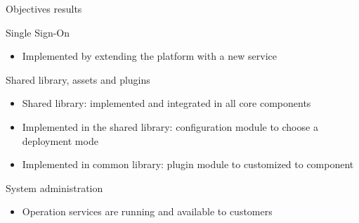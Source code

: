 \documentclass[10pt]{beamer}
\begin{document}
\begin{frame}{Objectives results}
  \begin{block}{Single Sign-On}
  \begin{itemize}
    \item Implemented by extending the platform with a new service
  \end{itemize}
  \end{block}
  \begin{block}{Shared library, assets and plugins}
    \begin{itemize}
      \item Shared library: implemented and integrated in all core components
      \item Implemented in the shared library: configuration module to choose a deployment mode
      \item Implemented in common library: plugin module to customized to component
    \end{itemize}
  \end{block}
  \begin{block}{System administration}
    \begin{itemize}
      \item Operation services are running and available to customers
    \end{itemize}
  \end{block}
\end{frame}
\end{document}
